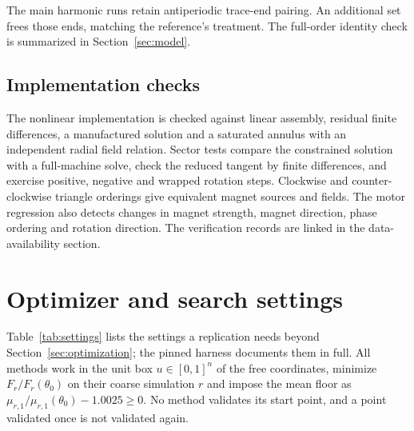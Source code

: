 \documentclass{anvil-paper}
\begin{document}
The main harmonic runs retain antiperiodic trace-end pairing. An additional
set frees those ends, matching the reference's treatment. The full-order
identity check is summarized in Section~\ref{sec:model}.

\subsection{Implementation checks}
The nonlinear implementation is checked against linear assembly, residual
finite differences, a manufactured solution and a saturated annulus with
an independent radial field relation. Sector tests compare the
constrained solution with a full-machine solve, check the reduced tangent
by finite differences, and exercise positive, negative and wrapped rotation
steps. Clockwise and counter-clockwise triangle orderings give equivalent
magnet sources and fields. The motor regression also detects changes in
magnet strength, magnet direction, phase ordering and rotation direction.
The verification records are linked in the data-availability section.

\section{Optimizer and search settings}\label{sec:settings}
Table~\ref{tab:settings} lists the settings a replication needs beyond
Section~\ref{sec:optimization}; the pinned harness documents them in full.
All methods work in the unit box $u\in[0,1]^n$ of the free coordinates,
minimize $F_r/F_r(\theta_0)$ on their coarse simulation $r$ and impose the
mean floor as $\mu_{r,1}/\mu_{r,1}(\theta_0)-1.0025\geq0$.
No method validates its start point, and a point validated once is not
validated again.
\end{document}
